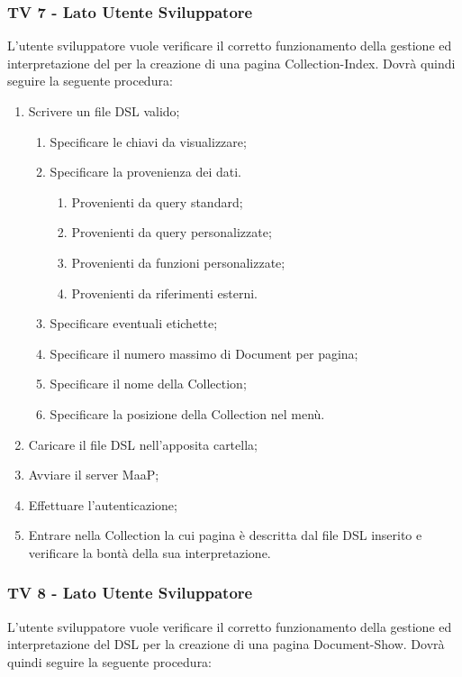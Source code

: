 \subsubsection{TV 7 - Lato Utente Sviluppatore}

L'utente sviluppatore vuole verificare il corretto funzionamento della gestione ed interpretazione del  per la creazione di una pagina Collection-Index.
Dovrà quindi seguire la seguente procedura:

\begin{enumerate}
\item Scrivere un file DSL valido;
\begin{enumerate}
\item Specificare le chiavi da visualizzare;
\item Specificare la provenienza dei dati.
\begin{enumerate}
\item Provenienti da query standard;
\item Provenienti da query personalizzate;
\item Provenienti da funzioni personalizzate;
\item Provenienti da riferimenti esterni.
\end{enumerate}
\item Specificare eventuali etichette;
\item Specificare il numero massimo di Document per pagina;
\item Specificare il nome della Collection;
\item Specificare la posizione della Collection nel menù.
\end{enumerate}
\item Caricare il file DSL nell'apposita cartella;
\item Avviare il server MaaP;
\item Effettuare l'autenticazione;
\item Entrare nella Collection la cui pagina è descritta dal file DSL inserito e verificare la bontà della sua interpretazione.
\end{enumerate}


\subsubsection{TV 8 - Lato Utente Sviluppatore}

L’utente sviluppatore vuole verificare il corretto funzionamento della gestione ed interpretazione del DSL per la creazione di una pagina Document-Show.
Dovrà quindi seguire la seguente procedura:

